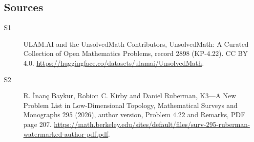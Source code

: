 \documentclass[11pt]{article}
\begin{document}
\subsection{Sources}
\begin{description}
\item[\hypertarget{source:2898:1}{S1}] ULAM.AI and the UnsolvedMath Contributors, UnsolvedMath: A Curated Collection of Open Mathematics Problems, record 2898 (KP-4.22). CC BY 4.0. \url{https://huggingface.co/datasets/ulamai/UnsolvedMath}.
\item[\hypertarget{source:2898:2}{S2}] R. İnanç Baykur, Robion C. Kirby and Daniel Ruberman, K3—A New Problem List in Low-Dimensional Topology, Mathematical Surveys and Monographs 295 (2026), author version, Problem 4.22 and Remarks, PDF page 207. \url{https://math.berkeley.edu/sites/default/files/surv-295-ruberman-watermarked-author-pdf.pdf}.
\end{description}
\label{end:2898}
\end{document}
